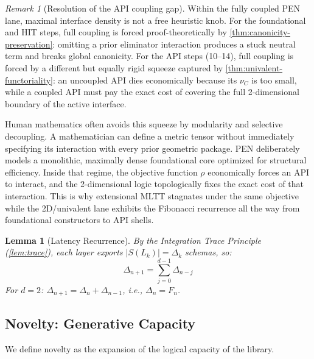 \documentclass[11pt,a4paper]{article}
\theoremstyle{plain}
\newtheorem{lemma}[theorem]{Lemma}
\theoremstyle{definition}
\theoremstyle{remark}
\newtheorem{remark}[theorem]{Remark}
\begin{document}
\begin{remark}[Resolution of the API coupling gap]
\label{rem:maximal-coupling}
Within the fully coupled PEN lane, maximal interface density is not a free heuristic knob.
For the foundational and HIT steps, full coupling is forced proof-theoretically by \cref{thm:canonicity-preservation}: omitting a prior eliminator interaction produces a stuck neutral term and breaks global canonicity.
For the API steps (10--14), full coupling is forced by a different but equally rigid squeeze captured by \cref{thm:univalent-functoriality}: an uncoupled API dies economically because its $\nu_C$ is too small, while a coupled API must pay the exact cost of covering the full 2-dimensional boundary of the active interface.

Human mathematics often avoids this squeeze by modularity and selective decoupling.
A mathematician can define a metric tensor without immediately specifying its interaction with every prior geometric package.
PEN deliberately models a monolithic, maximally dense foundational core optimized for structural efficiency.
Inside that regime, the objective function $\rho$ economically forces an API to interact, and the 2-dimensional logic topologically fixes the exact cost of that interaction.
This is why extensional MLTT stagnates under the same objective while the 2D/univalent lane exhibits the Fibonacci recurrence all the way from foundational constructors to API shells.
\end{remark}

\begin{lemma}[Latency Recurrence]
\label{lem:recurrence}
By the Integration Trace Principle (\cref{lem:trace}), each layer exports $|S(L_k)| = \Delta_k$ schemas, so:
\begin{equation}
    \Delta_{n+1} = \sum_{j=0}^{d-1} \Delta_{n-j}
\end{equation}
For $d = 2$: $\Delta_{n+1} = \Delta_n + \Delta_{n-1}$, i.e., $\Delta_n = F_n$.
\end{lemma}

\subsection{Novelty: Generative Capacity}

We define novelty as the expansion of the logical capacity of the library.
\end{document}
